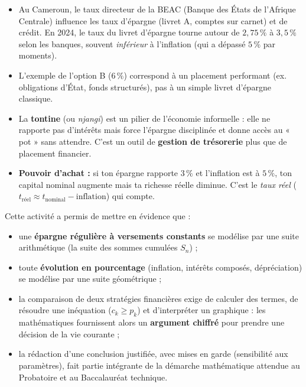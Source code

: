\documentclass[11pt]{article}
\newcounter{popsec}
\newcounter{popsub}
\newcommand{\courssub}[1]{%
  \stepcounter{popsub}%
  \par\vspace{9pt}\noindent{\popxbold\fontsize{11.5}{13}\selectfont\color{popink}{\color{poporange}\thepopsec.\thepopsub}\hspace{6pt}#1}\par\nopagebreak\vspace{4pt}
}
\begin{document}
\begin{savaistu}
\begin{itemize}
\item Au Cameroun, le taux directeur de la BEAC (Banque des États de l'Afrique Centrale) influence les taux d'épargne (livret A, comptes sur carnet) et de crédit. En 2024, le taux du livret d'épargne tourne autour de $2,75\,\%$ à $3,5\,\%$ selon les banques, souvent \emph{inférieur} à l'inflation (qui a dépassé $5\,\%$ par moments).
\item L'exemple de l'option B ($6\,\%$) correspond à un placement performant (ex. obligations d'État, fonds structurés), pas à un simple livret d'épargne classique.
\item La \textbf{tontine} (ou \emph{njangi}) est un pilier de l'économie informelle : elle ne rapporte pas d'intérêts mais force l'épargne disciplinée et donne accès au « pot » sans attendre. C'est un outil de \textbf{gestion de trésorerie} plus que de placement financier.
\item \textbf{Pouvoir d'achat :} si ton épargne rapporte $3\,\%$ et l'inflation est à $5\,\%$, ton capital nominal augmente mais ta richesse réelle diminue. C'est le \emph{taux réel} ($t_{\text{réel}} \approx t_{\text{nominal}} - \text{inflation}$) qui compte.
\end{itemize}
\end{savaistu}

\courssub{Bilan de l'activité}

Cette activité a permis de mettre en évidence que :
\begin{itemize}
\item une \textbf{épargne régulière à versements constants} se modélise par une suite arithmétique (la suite des sommes cumulées $S_n$) ;
\item toute \textbf{évolution en pourcentage} (inflation, intérêts composés, dépréciation) se modélise par une suite géométrique ;
\item la comparaison de deux stratégies financières exige de calculer des termes, de résoudre une inéquation ($c_k \geq p_k$) et d'interpréter un graphique : les mathématiques fournissent alors un \textbf{argument chiffré} pour prendre une décision de la vie courante ;
\item la rédaction d'une conclusion justifiée, avec mises en garde (sensibilité aux paramètres), fait partie intégrante de la démarche mathématique attendue au Probatoire et au Baccalauréat technique.
\end{itemize}
\end{document}
